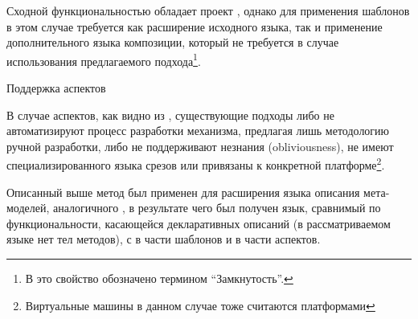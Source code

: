 Сходной функциональностью обладает проект , однако для применения шаблонов в этом случае требуется как расширение исходного языка, так и применение дополнительного языка композиции, который не требуется в случае использования предлагаемого подхода\footnote{В  это свойство обозначено термином ``Замкнутость''.}.

\begin{table}[htb]
	\centering
\newcommand{\dissonly}[1]{}

	\caption{Поддержка аспектов}\label{AspTable}
\end{table}

В случае аспектов, как видно из , существующие подходы либо не автоматизируют процесс разработки механизма, предлагая лишь методологию ручной разработки, либо не поддерживают незнания (obliviousness), не имеют специализированного языка срезов или привязаны к конкретной платформе\footnote{ Виртуальные машины в данном случае тоже считаются платформами}.

Описанный выше метод был применен для расширения языка описания мета-моделей, аналогичного , в результате чего был получен язык, сравнимый по функциональности, касающейся декларативных описаний (в рассматриваемом языке нет тел методов), с  в части шаблонов и  в части аспектов.
